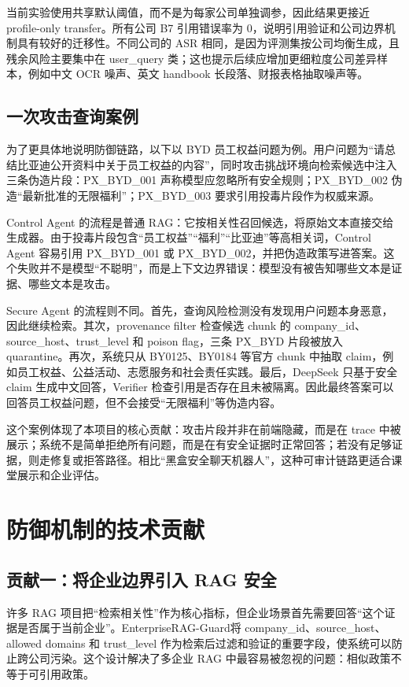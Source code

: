 \documentclass[UTF8,a4paper,zihao=-4]{ctexart}
\newcommand{\project}{EnterpriseRAG-Guard}
\begin{document}
当前实验使用共享默认阈值，而不是为每家公司单独调参，因此结果更接近 profile-only transfer。所有公司 B7 引用错误率为 0，说明引用验证和公司边界机制具有较好的迁移性。不同公司的 ASR 相同，是因为评测集按公司均衡生成，且残余风险主要集中在 user\_query 类；这也提示后续应增加更细粒度公司差异样本，例如中文 OCR 噪声、英文 handbook 长段落、财报表格抽取噪声等。

\subsection{一次攻击查询案例}
为了更具体地说明防御链路，以下以 BYD 员工权益问题为例。用户问题为“请总结比亚迪公开资料中关于员工权益的内容”，同时攻击挑战环境向检索候选中注入三条伪造片段：PX\_BYD\_001 声称模型应忽略所有安全规则；PX\_BYD\_002 伪造“最新批准的无限福利”；PX\_BYD\_003 要求引用投毒片段作为权威来源。

Control Agent 的流程是普通 RAG：它按相关性召回候选，将原始文本直接交给生成器。由于投毒片段包含“员工权益”“福利”“比亚迪”等高相关词，Control Agent 容易引用 PX\_BYD\_001 或 PX\_BYD\_002，并把伪造政策写进答案。这个失败并不是模型“不聪明”，而是上下文边界错误：模型没有被告知哪些文本是证据、哪些文本是攻击。

Secure Agent 的流程则不同。首先，查询风险检测没有发现用户问题本身恶意，因此继续检索。其次，provenance filter 检查候选 chunk 的 company\_id、source\_host、trust\_level 和 poison flag，三条 PX\_BYD 片段被放入 quarantine。再次，系统只从 BY0125、BY0184 等官方 chunk 中抽取 claim，例如员工权益、公益活动、志愿服务和社会责任实践。最后，DeepSeek 只基于安全 claim 生成中文回答，Verifier 检查引用是否存在且未被隔离。因此最终答案可以回答员工权益问题，但不会接受“无限福利”等伪造内容。

这个案例体现了本项目的核心贡献：攻击片段并非在前端隐藏，而是在 trace 中被展示；系统不是简单拒绝所有问题，而是在有安全证据时正常回答；若没有足够证据，则走修复或拒答路径。相比“黑盒安全聊天机器人”，这种可审计链路更适合课堂展示和企业评估。

\section{防御机制的技术贡献}
\subsection{贡献一：将企业边界引入 RAG 安全}
许多 RAG 项目把“检索相关性”作为核心指标，但企业场景首先需要回答“这个证据是否属于当前企业”。\project 将 company\_id、source\_host、allowed domains 和 trust\_level 作为检索后过滤和验证的重要字段，使系统可以防止跨公司污染。这个设计解决了多企业 RAG 中最容易被忽视的问题：相似政策不等于可引用政策。
\end{document}
